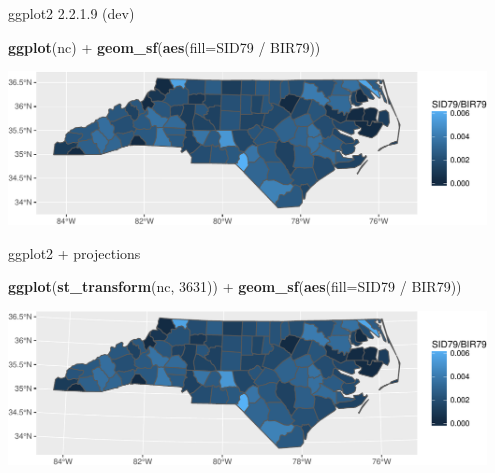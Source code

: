 \documentclass[11pt,ignorenonframetext,]{beamer}
\newenvironment{Shaded}{}{}
\newcommand{\KeywordTok}[1]{\textcolor[rgb]{0.00,0.44,0.13}{\textbf{#1}}}
\newcommand{\DataTypeTok}[1]{\textcolor[rgb]{0.56,0.13,0.00}{#1}}
\newcommand{\DecValTok}[1]{\textcolor[rgb]{0.25,0.63,0.44}{#1}}
\newcommand{\StringTok}[1]{\textcolor[rgb]{0.25,0.44,0.63}{#1}}
\newcommand{\OperatorTok}[1]{\textcolor[rgb]{0.40,0.40,0.40}{#1}}
\newcommand{\NormalTok}[1]{#1}
\let\oldShaded\Shaded
\let\endoldShaded\endShaded
\renewenvironment{Shaded}{\footnotesize\begin{spacing}{0.9}\oldShaded}{\endoldShaded\end{spacing}}
\let\oldverbatim\verbatim
\let\endoldverbatim\endverbatim
\newcommand{\scriptoutput}{
  \renewenvironment{Shaded}{\scriptsize\begin{spacing}{0.9}\oldShaded}{\endoldShaded\end{spacing}}
  \renewenvironment{verbatim}{\scriptsize\begin{spacing}{0.9}\oldverbatim}{\endoldverbatim\end{spacing}}
}
\begin{document}
\begin{frame}[fragile,t]{ggplot2 2.2.1.9 (dev)}

\scriptoutput

\begin{Shaded}
\begin{Highlighting}[]
\KeywordTok{ggplot}\NormalTok{(nc) }\OperatorTok{+}\StringTok{ }
\StringTok{  }\KeywordTok{geom_sf}\NormalTok{(}\KeywordTok{aes}\NormalTok{(}\DataTypeTok{fill=}\NormalTok{SID79 }\OperatorTok{/}\StringTok{ }\NormalTok{BIR79))}
\end{Highlighting}
\end{Shaded}

\begin{center}\includegraphics[width=0.95\textwidth]{Lec17_files/figure-beamer/unnamed-chunk-6-1} \end{center}

\end{frame}

\begin{frame}[fragile,t]{ggplot2 + projections}

\scriptoutput

\begin{Shaded}
\begin{Highlighting}[]
\KeywordTok{ggplot}\NormalTok{(}\KeywordTok{st_transform}\NormalTok{(nc, }\DecValTok{3631}\NormalTok{)) }\OperatorTok{+}\StringTok{ }
\StringTok{  }\KeywordTok{geom_sf}\NormalTok{(}\KeywordTok{aes}\NormalTok{(}\DataTypeTok{fill=}\NormalTok{SID79 }\OperatorTok{/}\StringTok{ }\NormalTok{BIR79))}
\end{Highlighting}
\end{Shaded}

\begin{center}\includegraphics[width=0.95\textwidth]{Lec17_files/figure-beamer/unnamed-chunk-7-1} \end{center}

\end{frame}
\end{document}
